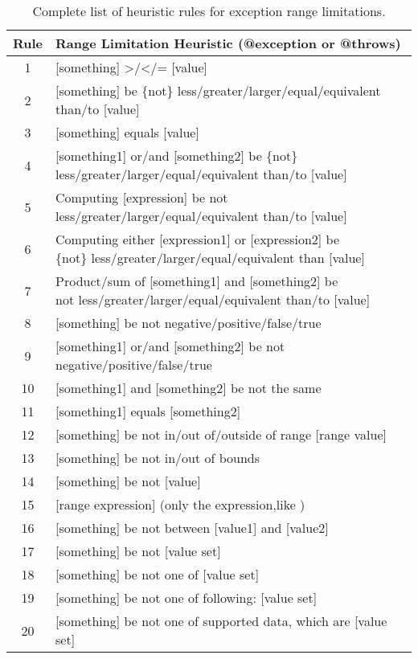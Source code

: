 \begin{table}[h]
	\centering
	\begin{tabular}{|c|l|}
		\hline
		\textbf{Rule} & \textbf{Range Limitation Heuristic (@exception or @throws)} \\ \hline
		1 & [something] >/</= [value] \\ \hline
		2 & [something] be \{not\} less/greater/larger/equal/equivalent than/to [value] \\ \hline
		3 & [something] equals [value] \\ \hline
		4 & \makecell{[something1] or/and [something2] be \{not\} \\ less/greater/larger/equal/equivalent than/to [value]} \\ \hline
		5 & \makecell{Computing [expression] be {not} \\ less/greater/larger/equal/equivalent than/to [value]} \\ \hline
		6 & \makecell{Computing either [expression1] or [expression2] be \\ \{not\} less/greater/larger/equal/equivalent than [value]} \\ \hline
		7 & \makecell{Product/sum of [something1] and [something2] be \\ {not} less/greater/larger/equal/equivalent than/to [value]} \\ \hline
		8 & [something] be {not} negative/positive/false/true \\ \hline
		9 & [something1] or/and [something2] be {not} negative/positive/false/true \\ \hline
		10 & [something1] and [something2] be {not} the same \\ \hline
		11 & [something1] equals [something2] \\ \hline
		12 & [something] be {not} in/out of/outside of range [range value] \\ \hline
		13 & [something] be {not} in/out of bounds \\ \hline
		14 & [something] be {not} [value] \\ \hline
		15 & [range expression] (only the expression,like ) \\ \hline
		16 & [something] be {not} between [value1] and [value2] \\ \hline
		17 & [something] be {not} [value set] \\ \hline
		18 & [something] be {not} one of [value set] \\ \hline
		19 & [something] be {not} one of following: [value set] \\ \hline
		20 & [something] be {not} one of supported data, which are [value set] \\ \hline
	\end{tabular}
	\caption{Complete list of heuristic rules for exception range limitations.}
	\label{tab:complete-heuristics-range-limit-except}
\end{table}

